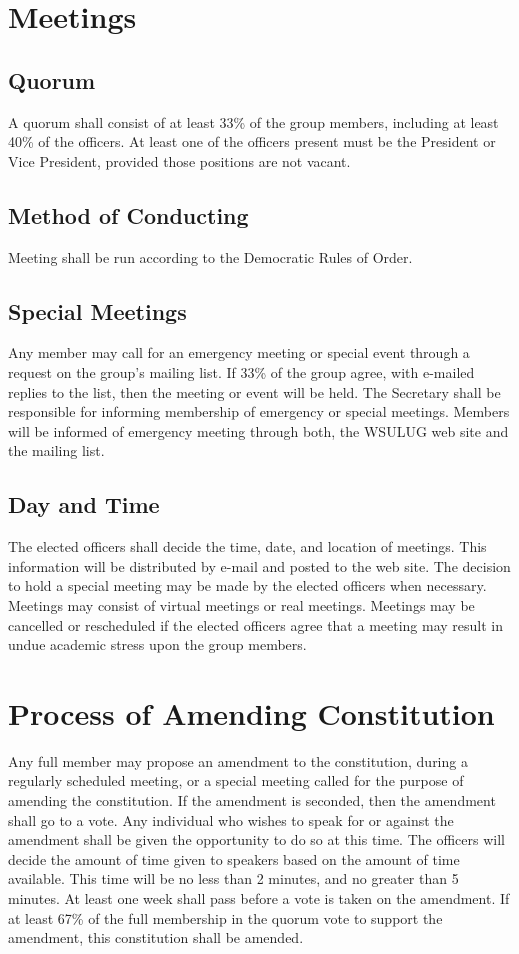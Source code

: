 \documentclass{article}
\begin{document}
\section{Meetings}
\subsection{Quorum}
A quorum shall consist of at least 33\% of the group members, including at least 40\% of the officers.  At least one of the officers present must be the President or Vice President, provided those positions are not vacant.
\subsection{Method of Conducting}
Meeting shall be run according to the Democratic Rules of Order.
\subsection{Special Meetings}
Any member may call for an emergency meeting or special event through a request on the group's mailing list.  If 33\% of the group agree, with e-mailed replies to the list, then the meeting or event will be held. The Secretary shall be responsible for informing membership of emergency or special meetings. Members will be informed of emergency meeting through both, the WSULUG web site and the mailing list.
\subsection{Day and Time}
The elected officers shall decide the time, date, and location of meetings. This information will be distributed by e-mail and posted to the web site. The decision to hold a special meeting may be made by the elected officers when necessary. Meetings may consist of virtual meetings or real meetings. Meetings may be cancelled or rescheduled if the elected officers agree that a meeting may result in undue academic stress upon the group members.

\section{Process of Amending Constitution}
Any full member may propose an amendment to the constitution, during a regularly scheduled meeting, or a special meeting called for the purpose of amending the constitution. If the amendment is seconded, then the amendment shall go to a vote. Any individual who wishes to speak for or against the amendment shall be given the opportunity to do so at this time. The officers will decide the amount of time given to speakers based on the amount of time available. This time will be no less than 2 minutes, and no greater than 5 minutes. At least one week shall pass before a vote is taken on the amendment. If at least 67\% of the full membership in the quorum vote to support the amendment, this constitution shall be amended.
\end{document}
